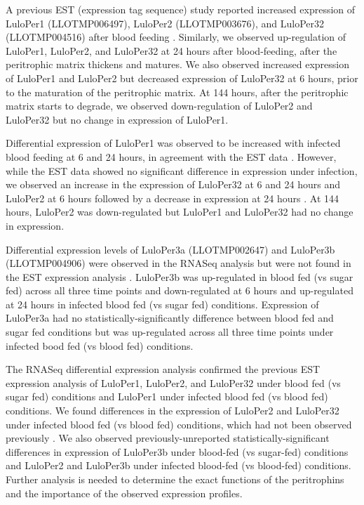 A previous EST (expression tag sequence) study reported increased expression of LuloPer1 (LLOTMP006497), LuloPer2 (LLOTMP003676), and LuloPer32 (LLOTMP004516) after blood feeding \cite{Jochim2008}. Similarly, we observed up-regulation of LuloPer1, LuloPer2, and LuloPer32 at 24 hours after blood-feeding, after the peritrophic matrix thickens and matures.  We also observed increased expression of LuloPer1 and LuloPer2 but decreased expression of LuloPer32 at 6 hours, prior to the maturation of the peritrophic matrix. At 144 hours, after the peritrophic matrix starts to degrade, we observed down-regulation of LuloPer2 and LuloPer32 but no change in expression of LuloPer1.

Differential expression of LuloPer1 was observed to be increased with infected blood feeding at 6 and 24 hours, in agreement with the EST data \cite{Jochim2008,Dostalova2012}.  However, while the EST data showed no significant difference in expression under infection, we observed an increase in the expression of LuloPer32 at 6 and 24 hours and LuloPer2 at 6 hours followed by a decrease in expression at 24 hours \cite{Jochim2008}.  At 144 hours, LuloPer2 was down-regulated but LuloPer1 and LuloPer32 had no change in expression.

Differential expression levels of LuloPer3a (LLOTMP002647) and LuloPer3b (LLOTMP004906) were observed in the RNASeq analysis but were not found in the EST expression analysis \cite{Jochim2008}. LuloPer3b was up-regulated in blood fed (vs sugar fed) across all three time points and down-regulated at 6 hours and up-regulated at 24 hours in infected blood fed (vs sugar fed) conditions.  Expression of LuloPer3a had no statistically-significantly difference between blood fed and sugar fed conditions but was up-regulated across all three time points under infected bood fed (vs blood fed) conditions.

The RNASeq differential expression analysis confirmed the previous EST expression analysis of LuloPer1, LuloPer2, and LuloPer32 under blood fed (vs sugar fed) conditions and LuloPer1 under infected blood fed (vs blood fed) conditions.  We found differences in the expression of LuloPer2 and LuloPer32 under infected blood fed (vs blood fed) conditions, which had not been observed previously \cite{Jochim2008,Dostalova2012}.  We also observed previously-unreported statistically-significant differences in expression of LuloPer3b under blood-fed (vs sugar-fed) conditions and LuloPer2 and LuloPer3b under infected blood-fed (vs blood-fed) conditions. Further analysis is needed to determine the exact functions of the peritrophins and the importance of the observed expression profiles.


